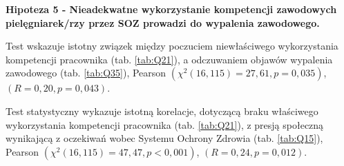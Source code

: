 \documentclass[a4paper,12pt,twoside,openright]{mwrep}
\begin{document}
  
  


 	
	


   
	

\vspace{\baselineskip} 
\textbf{Hipoteza 5 - Nieadekwatne wykorzystanie kompetencji zawodowych pielęgniarek/rzy  przez SOZ prowadzi do wypalenia zawodowego.}
\vspace{\baselineskip}





Test wskazuje  istotny związek między poczuciem niewłaściwego wykorzystania kompetencji pracownika (tab. \ref{tab:Q21}), a odczuwaniem objawów wypalenia zawodowego (tab. \ref{tab:Q35}), Pearson $(\chi^2 (16, 115) = 27,61, p = 0,035)$, $(R = 0,20, p = 0,043)$.

Test statystyczny wykazuje istotną korelacje, dotyczącą braku właściwego wykorzystania kompetencji pracownika  (tab. \ref{tab:Q21}), z presją społeczną wynikającą z oczekiwań wobec Systemu Ochrony Zdrowia (tab. \ref{tab:Q15}), Pearson $(\chi^2 (16, 115) = 47,47, p < 0,001)$, $(R = 0,24, p = 0,012)$.







%
\end{document}
